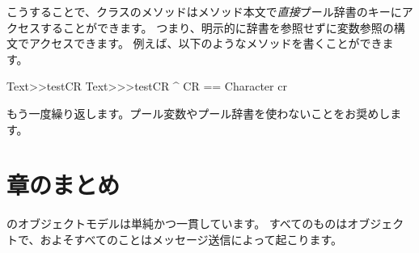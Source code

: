 \documentclass[a4paper,10pt,twoside]{book}
\begin{document}
こうすることで、クラスのメソッドはメソッド本文で\emph{直接}プール辞書のキーにアクセスすることができます。
つまり、明示的に辞書を参照せずに変数参照の構文でアクセスできます。
例えば、以下のようなメソッドを書くことができます。
  
\begin{method}[texttestcr]{Text>>testCR}
Text>>>testCR 	
      ^ CR == Character cr
\end{method}

もう一度繰り返します。プール変数やプール辞書を使わないことをお奨めします。

\section{章のまとめ}

\pharo のオブジェクトモデルは単純かつ一貫しています。
すべてのものはオブジェクトで、およそすべてのことはメッセージ送信によって起こります。
\end{document}
